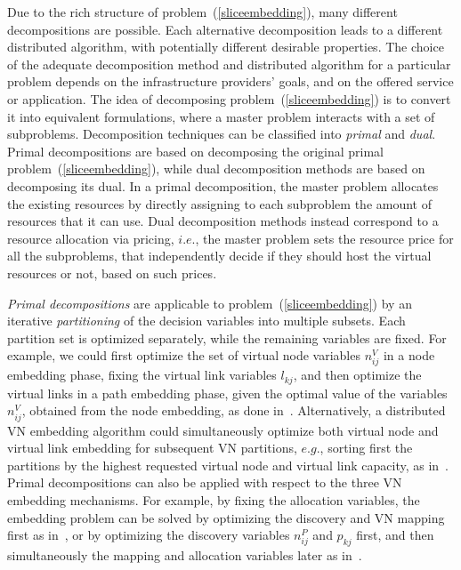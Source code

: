 \documentclass[a4paper, 10pt, conference]{ieeeconf}
\begin{document}
Due to the rich structure of problem~(\ref{sliceembedding}), many different decompositions are possible.  
 Each alternative decomposition leads to a different distributed algorithm, with potentially different desirable properties. 
The choice of the adequate decomposition method and distributed algorithm for a particular problem depends on the infrastructure providers' goals, and on the offered service or application. 
The idea of decomposing problem~(\ref{sliceembedding}) is to convert it into equivalent formulations, where a master problem interacts with a set of subproblems. Decomposition techniques can be classified into {\it primal} and {\it dual}. Primal decompositions are based on decomposing the original primal problem~(\ref{sliceembedding}), while dual decomposition methods are based on decomposing its dual. 
In a primal decomposition, the master problem allocates the existing resources by directly assigning to each subproblem the amount of resources that it can use. Dual decomposition methods instead correspond to a resource allocation via pricing, $i.e.$, the master problem sets the resource price for all the subproblems, that independently decide if they should host the virtual resources or not, based on such prices.


{\it Primal decompositions} are applicable to problem~(\ref{sliceembedding}) by an iterative {\it partitioning} of the decision variables into multiple subsets. Each partition set is optimized separately, while the remaining variables are fixed.
For example, we could first optimize the set of virtual node variables $n_{ij}^V$ in a node embedding phase, fixing the virtual link variables $l_{kj}$, and then optimize the virtual links in a path embedding phase, given the optimal value of the variables $n_{ij}^{V}$, obtained from the node embedding, as done in~\cite{CAD,pathsplitting}.
Alternatively, a distributed VN embedding algorithm could simultaneously optimize both virtual node and virtual link embedding for subsequent VN partitions, $e.g.$, sorting first the partitions by the highest requested virtual node and virtual link capacity, as in~\cite{Houidi-distributedVNM}.
Primal decompositions can also be applied with respect to the three VN embedding mechanisms. For example, by fixing the allocation variables, the embedding problem can be solved by optimizing the discovery and VN mapping first as in~\cite{Polyvine}, or by optimizing the discovery variables ${n}_{ij}^P$ and ${ p}_{kj}$  first, and then simultaneously the mapping and allocation variables later as in~\cite{sword}.
\end{document}
